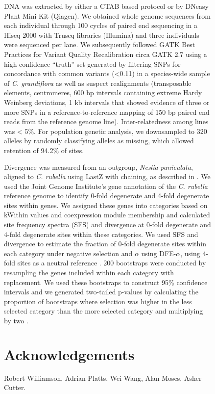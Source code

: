 \begin{figure}[ht!]
DNA was extracted by either a CTAB based protocol or by DNeasy Plant Mini Kit (Qiagen). We obtained whole genome sequences from each individual through 100 cycles of paired end sequencing in a Hiseq 2000 with Truseq libraries (Illumina) and three individuals were sequenced per lane. We subsequently followed GATK Best Practices for Variant Quality Recalibration circa GATK 2.7 \citep{DePristo2011-jc} using a high confidence “truth” set generated by filtering SNPs for concordance with common variants (\textless0.11) in a species-wide sample of \textit{C. grandiflora} as well as suspect realignments (transposable elements, centromeres, 600 bp intervals containing extreme Hardy Weinberg deviations, 1 kb intervals that showed evidence of three or more SNPs in a reference-to-reference mapping of 150 bp paired end reads from the reference genome line). Inter-relatedness among lines was < 5\%. For population genetic analysis, we downsampled to 320 alleles by randomly classifying alleles as missing, which allowed retention of 94.2\% of sites.

Divergence was measured from an outgroup, \textit{Neslia paniculata}, aligned to \textit{C. rubella} using LastZ with chaining, as described in \citep{Haudry2013-qe}. We used the Joint Genome Institute’s gene annotation of the \textit{C. rubella} reference genome to identify 0-fold degenerate and 4-fold degenerate sites within genes. We assigned these genes into categories based on kWithin values and coexpression module membership and calculated site frequency spectra (SFS) and divergence at 0-fold degenerate and 4-fold degenerate sites within these categories.  We used SFS and divergence to estimate the fraction of 0-fold degenerate sites within each category under negative selection and $\alpha$ using DFE-$\alpha$, using 4-fold sites as a neutral reference \citep{eyre2009,keightley2007}. 200 bootstraps were conducted by resampling the genes included within each category with replacement. We used these bootstraps to construct 95\% confidence intervals and we generated two-tailed p-values by calculating the proportion of bootstraps where selection was higher in the less selected category than the more selected category and multiplying by two \citep{Eyre-Walker2009-zt}. 



\section{Acknowledgements}
Robert Williamson, Adrian Platts, Wei Wang, Alan Moses, Asher Cutter.


\end{figure}
